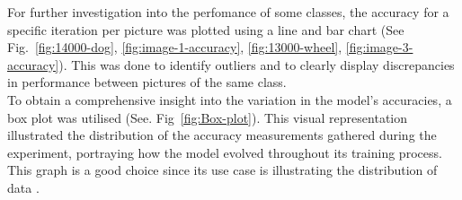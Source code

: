 For further investigation into the perfomance of some classes, the accuracy for a specific iteration per picture was plotted 
using a line and bar chart (See Fig.~\ref{fig:14000-dog}, \ref{fig:image-1-accuracy}, \ref{fig:13000-wheel}, \ref{fig:image-3-accuracy}). 
This was done to identify outliers and to clearly display discrepancies in performance between pictures of the same class.\\
To obtain a comprehensive insight into the variation in the model's accuracies, a box plot was utilised (See. Fig~\ref{fig:Box-plot}). This visual representation illustrated the distribution of the accuracy measurements gathered during the experiment, portraying how the model evolved throughout its training process.
This graph is a good choice since its use case is illustrating the distribution of data \parencite{Tableau}. \\

